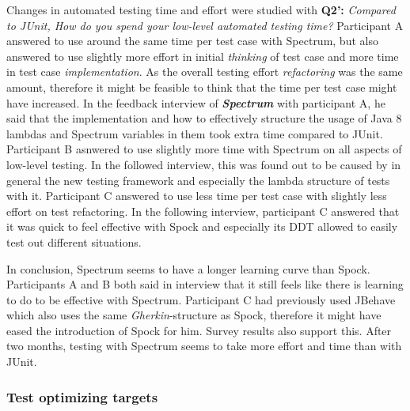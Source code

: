 Changes in automated testing time and effort were studied with \textbf{Q2':} \textit{Compared to JUnit, How do you spend your low-level automated testing time?}
Participant A answered
to use around the same time per test case with Spectrum, but also answered to use slightly more effort in initial \textit{thinking} of test
case and more time in test case \textit{implementation}. As the overall testing effort \textit{refactoring} was the same amount, therefore it might
be feasible to think that the time per test case might have increased. In the feedback interview of \textbf{\textit{Spectrum}} with participant
A, he said that the implementation and how to effectively structure the usage of Java 8 lambdas and Spectrum variables
in them took extra time compared to JUnit. Participant B asnwered to use slightly more time with Spectrum on all aspects of low-level testing.
In the followed interview, this was found out to be caused by in general the new testing framework and especially the lambda structure
of tests with it. Participant C answered to use less time per test case with slightly less effort on test refactoring. In the
following interview, participant C answered that it was quick to feel effective with Spock and especially its DDT allowed to
easily test out different situations.

In conclusion, Spectrum seems to have a longer learning curve than Spock. Participants A and B both said in interview that it still
feels like there is learning to do to be effective with Spectrum. Participant C had previously used JBehave which also
uses the same \textit{Gherkin}-structure as Spock, therefore it might have eased the introduction of Spock for him. Survey
results also support this. After two months, testing with Spectrum seems to take more effort and time than with JUnit.

\subsubsection{Test optimizing targets}

